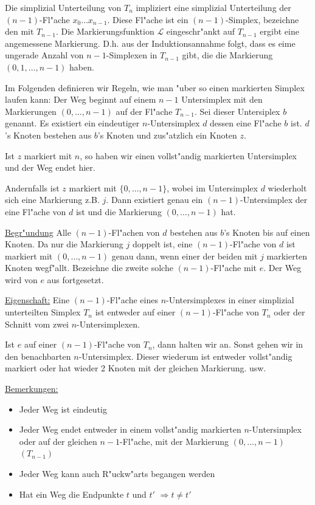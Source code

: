 \documentclass[11pt, a4paper, twoside]{article}
\numberwithin{equation}{section}
\begin{document}
Die simplizial Unterteilung von $T_n$ impliziert eine simplizial Unterteilung der $(n-1)$-Fl"ache $x_0 \ldots x_{n-1}.$
Diese Fl"ache ist ein $(n-1)$-Simplex, bezeichne den mit $T_{n-1}$.
Die Markierungsfunktion $ \mathcal{L}$ eingeschr"ankt auf $T_{n-1}$ ergibt eine angemessene Markierung.
D.h. aus der Induktionsannahme folgt, dass es eime ungerade Anzahl von $n-1$-Simplexen in $T_{n-1}$ gibt, die die Markierung $(0, 1, \ldots,n-1)$ haben.

Im Folgenden definieren wir Regeln, wie man "uber so einen markierten Simplex laufen kann:
Der Weg beginnt auf einem $n-1$ Untersimplex mit den Markierungen $(0, \ldots, n-1)$ auf der Fl"ache $T_{n-1}$.
Sei dieser Untersiplex $b$ genannt.
Es existiert ein eindeutiger $n$-Untersimplex $d$ dessen eine Fl"ache $b$ ist.
$d$'s Knoten bestehen aus $b$'s Knoten und zus"atzlich ein Knoten $z$.

Ist $z$ markiert mit $n$, so haben wir einen vollst"andig markierten Untersimplex und der Weg endet hier.

Andernfalls ist $z$ markiert mit $\{0, \ldots,n-1\}$, wobei im Untersimplex $d$ wiederholt sich eine Markierung z.B. $j$.
Dann existiert genau ein $(n-1)$-Untersimplex der eine Fl"ache von $d$ ist und die Markierung $(0, \ldots,n-1)$ hat.

\underline{Begr"undung}
Alle $(n-1)$-Fl"achen von $d$ bestehen aus $b$'s Knoten bis auf einen Knoten.
Da nur die Markierung $j$ doppelt ist, eine $(n-1)$-Fl"ache von $d$ ist markiert mit $(0, \ldots,n-1)$ genau dann, wenn einer der beiden mit $j$ markierten Knoten wegf"allt.
Bezeichne die zweite solche $(n-1)$-Fl"ache mit $e$.
Der Weg wird von $e$ aus fortgesetzt.

\underline{Eigenschaft:}
Eine $(n-1)$-Fl"ache eines $n$-Untersimplexes in einer simplizial unterteilten Simplex $T_n$ ist entweder auf einer $(n-1)$-Fl"ache von $T_n$ oder der Schnitt vom zwei $n$-Untersimplexen.

Ist $e$ auf einer $(n-1)$-Fl"ache von $T_n$, dann halten wir an.
Sonst gehen wir in den  benachbarten $n$-Untersimplex.
Dieser wiederum ist entweder vollst"andig markiert oder hat wieder 2 Knoten mit der gleichen Markierung. usw.

\underline{Bemerkungen:}
\begin{itemize}

\item
Jeder Weg ist eindeutig

\item
Jeder Weg endet entweder in einem vollst"andig markierten $n$-Untersimplex oder auf der gleichen $n-1$-Fl"ache, mit der Markierung $(0, \ldots, n-1)$ $(T_{n-1})$

\item
Jeder Weg kann auch R"uckw"arts begangen werden

\item
Hat ein Weg die Endpunkte $t$ und $t'$ $\Rightarrow t\neq t'$
\end{itemize}
\end{document}
